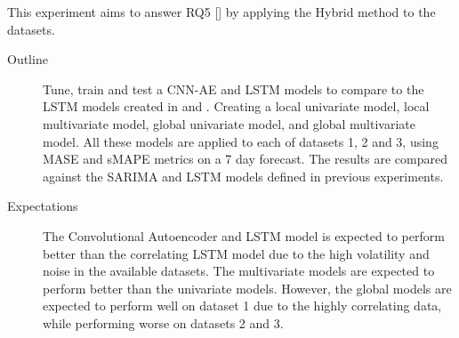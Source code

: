This experiment aims to answer RQ5 [] by applying the Hybrid method
to the datasets.


\begin{description}
  \item[Outline]{
              Tune, train and test a CNN-AE and LSTM models to compare to the LSTM models
              created in  and .
              Creating a local univariate model, local multivariate model, global univariate model, and global multivariate model.
              All these models are applied to each of datasets 1, 2 and 3, using MASE and sMAPE metrics on a 7 day forecast.
              The results are compared against the SARIMA and LSTM models defined in previous experiments.
        }
\end{description}

\begin{description}
  \item[Expectations]{
              The Convolutional Autoencoder and LSTM model is expected to perform better than the correlating LSTM model
              due to the high volatility and noise in the available datasets.
              The multivariate models are expected to perform better than the univariate models.
              However, the global models are expected to perform well on dataset 1 due to the highly correlating data,
              while performing worse on datasets 2 and 3.
        }
\end{description}